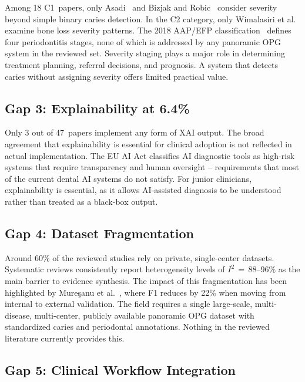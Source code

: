 \documentclass[conference]{IEEEtran}
\begin{document}
Among 18 C1~papers, only Asadi~\cite{asadi2024detection} and Bizjak and
Robic~\cite{bizjak2024advancing} consider severity beyond simple
binary caries detection. In the C2 category, only Wimalasiri et
al.~\cite{wimalasiri2025ai} examine bone loss severity patterns. The
2018 AAP/EFP classification~\cite{chmielewski20252018} defines four
periodontitis stages, none of which is addressed by any panoramic OPG system in the reviewed set. Severity staging plays a major role in determining treatment planning, referral decisions, and prognosis. A system that detects caries without assigning severity offers limited practical value.

\subsection{Gap 3: Explainability at 6.4\%}

Only 3 out of 47~papers implement any form of XAI output. The broad agreement that explainability is essential for clinical adoption 
\cite{nassiri2025yolo,gamal2025automated,sastika2025ai,ferrara2025applications}
is not reflected in actual implementation. The EU AI Act classifies AI diagnostic tools as high-risk systems that require transparency and human oversight – requirements that most of the current dental AI systems do not satisfy. For junior clinicians, explainability is essential, as it allows AI-assisted diagnosis to be understood rather than treated as a black-box output.

\subsection{Gap 4: Dataset Fragmentation}

Around 60\% of the reviewed studies rely on private,
single-center datasets. Systematic reviews
\cite{iacob2025automated,albano2024artificial,luke2025accuracy,bonfanti2025deep,khubrani2025detection}
consistently report heterogeneity levels of $I^2\,=\,88$--$96\%$ as the main
barrier to evidence synthesis. The impact of this fragmentation has been highlighted by
Mure\c{s}anu et al.~\cite{muresanu2024automating}, where F1 reduces by 22\% when moving from internal to external validation. The field requires a single
large-scale, multi-disease, multi-center, publicly available panoramic
OPG dataset with standardized caries and periodontal annotations.
Nothing in the reviewed literature currently provides this.

\subsection{Gap 5: Clinical Workflow Integration}
\end{document}
